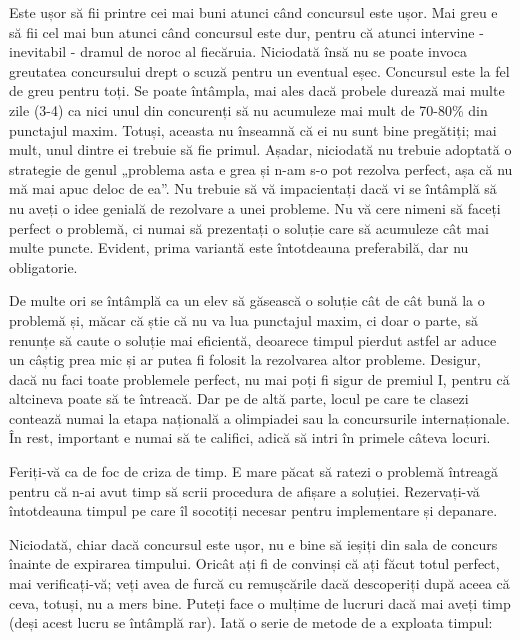 Este ușor să fii printre cei mai buni atunci când concursul este ușor. Mai
greu e să fii cel mai bun atunci când concursul este dur, pentru că atunci
intervine - inevitabil - dramul de noroc al fiecăruia. Niciodată însă nu se
poate invoca greutatea concursului drept o scuză pentru un eventual
eșec. Concursul este la fel de greu pentru toți. Se poate întâmpla, mai ales
dacă probele durează mai multe zile (3-4) ca nici unul din concurenți să nu
acumuleze mai mult de 70-80\% din punctajul maxim. Totuși, aceasta nu înseamnă
că ei nu sunt bine pregătiți; mai mult, unul dintre ei trebuie să fie
primul. Așadar, niciodată nu trebuie adoptată o strategie de genul „problema
asta e grea și n-am s-o pot rezolva perfect, așa că nu mă mai apuc deloc de
ea”. Nu trebuie să vă impacientați dacă vi se întâmplă să nu aveți o idee
genială de rezolvare a unei probleme. Nu vă cere nimeni să faceți perfect o
problemă, ci numai să prezentați o soluție care să acumuleze cât mai multe
puncte. Evident, prima variantă este întotdeauna preferabilă, dar nu
obligatorie.

De multe ori se întâmplă ca un elev să găsească o soluție cât de cât bună la o
problemă și, măcar că știe că nu va lua punctajul maxim, ci doar o parte, să
renunțe să caute o soluție mai eficientă, deoarece timpul pierdut astfel ar
aduce un câștig prea mic și ar putea fi folosit la rezolvarea altor
probleme. Desigur, dacă nu faci toate problemele perfect, nu mai poți fi sigur
de premiul I, pentru că altcineva poate să te întreacă. Dar pe de altă parte,
locul pe care te clasezi contează numai la etapa națională a olimpiadei sau la
concursurile internaționale. În rest, important e numai să te califici, adică
să intri în primele câteva locuri.

Feriți-vă ca de foc de criza de timp. E mare păcat să ratezi o problemă
întreagă pentru că n-ai avut timp să scrii procedura de afișare a
soluției. Rezervați-vă întotdeauna timpul pe care îl socotiți necesar pentru
implementare și depanare.

Niciodată, chiar dacă concursul este ușor, nu e bine să ieșiți din sala de
concurs înainte de expirarea timpului. Oricât ați fi de convinși că ați făcut
totul perfect, mai verificați-vă; veți avea de furcă cu remușcările dacă
descoperiți după aceea că ceva, totuși, nu a mers bine. Puteți face o mulțime
de lucruri dacă mai aveți timp (deși acest lucru se întâmplă rar). Iată o
serie de metode de a exploata timpul:

